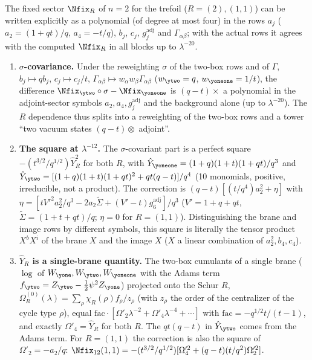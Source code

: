 \begin{result}[rows of $n = 2$ and the $R$ dependence]\label{cr:n2rows}
The fixed sector $\Nfix_R$ of $n = 2$ for the trefoil ($R = (2), (1,1)$) can be written explicitly as a polynomial (of degree at most four) in the rows $a_j$ ($a_2 = (1+qt)/q$, $a_4 = -t/q$), $b_j$, $c_j$, $g^{\mathrm{adj}}_j$ and $\Gamma_{\alpha\beta}$; with the actual rows it agrees with the computed $\Nfix_R$ in all blocks up to $\lambda^{-20}$.
\begin{enumerate}
\item \textbf{$\sigma$-covariance.} Under the reweighting $\sigma$ of the two-box rows and of $\Gamma$, $b_j \mapsto qb_j$, $c_j \mapsto c_j/t$, $\Gamma_{\alpha\beta} \mapsto w_\alpha w_\beta \Gamma_{\alpha\beta}$ ($w_{\ytwo} = q$, $w_{\yoneone} = 1/t$), the difference $\Nfix_{\ytwo}\circ\sigma - \Nfix_{\yoneone}$ is $(q-t)\times$ a polynomial in the adjoint-sector symbols $a_2, a_4, g^{\mathrm{adj}}_j$ and the background alone (up to $\lambda^{-20}$). The $R$ dependence thus splits into a reweighting of the two-box rows and a tower ``two vacuum states $(q-t)\otimes$ adjoint''.
\item \textbf{The square at $\lambda^{-12}$.} The $\sigma$-covariant part is a perfect square $-(t^{3/2}/q^{1/2})\hat Y_R^2$ for both $R$, with $\hat Y_{\yoneone} = (1+q)(1+t)(1+qt)/q^3$ and $\hat Y_{\ytwo} = [(1+q)(1+t)(1+qt)^2 + qt(q-t)]/q^4$ (10 monomials, positive, irreducible, not a product). The correction is $(q-t)[(t/q^4)a_2^2 + \eta]$ with $\eta = [tV'^2a_2^2/q^3 - 2a_2\tilde\Sigma + (V'-t)g^{\mathrm{adj}}_6]/q^3$ ($V' = 1+q+qt$, $\tilde\Sigma = (1+t+qt)/q$; $\eta = 0$ for $R = (1,1)$). Distinguishing the brane and image rows by different symbols, this square is literally the tensor product $X^bX^i$ of the brane $X$ and the image $X$ ($X$ a linear combination of $a_2^2, b_4, c_4$).
\item \textbf{$\hat Y_R$ is a single-brane quantity.} The two-box cumulants of a single brane ($\log$ of $W_{\yone}, W_{\ytwo}, W_{\yoneone}$ with the Adams term $f_{\ytwo} = Z_{\ytwo} - \tfrac12\psi^2 Z_{\yone}$) projected onto the Schur $R$, $\Omega^{(0)}_R(\lambda) = \sum_\rho \chi_R(\rho)f_\rho/z_\rho$ (with $z_\rho$ the order of the centralizer of the cycle type $\rho$), equal $\mathrm{fac}\cdot[\Omega'_2\lambda^{-2} + \Omega'_4\lambda^{-4} + \cdots]$ with $\mathrm{fac} = -q^{1/2}t/(t-1)$, and exactly $\Omega'_4 = \hat Y_R$ for both $R$. The $qt(q-t)$ in $\hat Y_{\ytwo}$ comes from the Adams term. For $R = (1,1)$ the correction is also the square of $\Omega'_2 = -a_2/q$: $\Nfix_{12}(1,1) = -(t^{3/2}/q^{1/2})[\Omega_4'^2 + (q-t)(t/q^2)\Omega_2'^2]$.
\end{enumerate}
\end{result}
